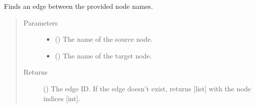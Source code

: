 \documentclass[letterpaper,10pt,english]{sphinxmanual}
\begin{document}
\begin{fulllineitems}
\begin{fulllineitems}
\begin{quote}
\begin{description}
\end{description}\end{quote}

\end{fulllineitems}


\begin{fulllineitems}
\label{\detokenize{reference:pypath.main.PyPath.straight_between}}
Finds an edge between the provided node names.
\begin{quote}\begin{description}
\item[{Parameters}] \leavevmode\begin{itemize}
\item {} 
 () \textendash{} The name of the source node.

\item {} 
 () \textendash{} The name of the target node.

\end{itemize}

\item[{Returns}] \leavevmode
() \textendash{} The edge ID. If the edge doesn’t exist, returns
{[}list{]} with the node indices {[}int{]}.

\end{description}\end{quote}

\end{fulllineitems}


\begin{fulllineitems}
\label{\detokenize{reference:pypath.main.PyPath.string_effects}}
\end{fulllineitems}



\end{fulllineitems}
\end{document}
